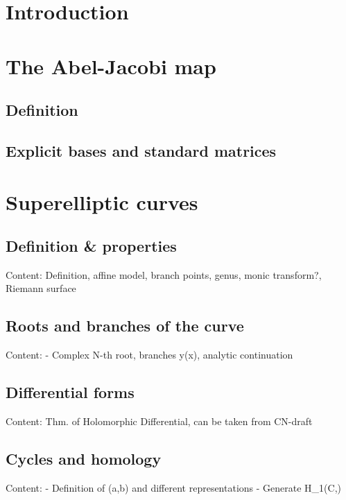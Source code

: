 

\section{Introduction}

\section{The Abel-Jacobi map}

  \subsection{Definition}

  \subsection{Explicit bases and standard matrices}

\section{Superelliptic curves}

  \subsection{Definition \& properties}
    Content: Definition, affine model, branch points, genus, monic transform?, Riemann surface
  
  \subsection{Roots and branches of the curve}
    Content: - Complex N-th root, branches y(x), analytic continuation
  
  \subsection{Differential forms}
    Content: Thm. of Holomorphic Differential, can be taken from CN-draft
  
  \subsection{Cycles and homology}
    Content: - Definition of \alpha(a,b) and different representations
	     - Generate H_1(C,\Z)
  
